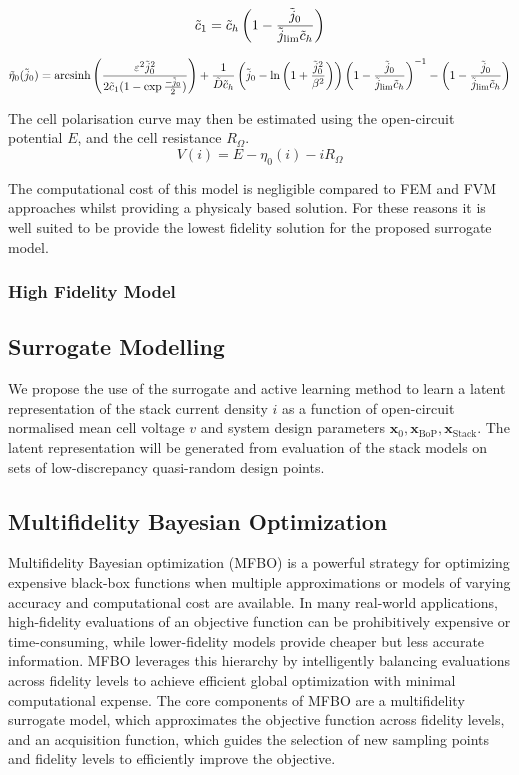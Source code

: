 \begin{equation}
	\tilde{c}_1 = \tilde{c}_h \left(1 - \frac{\tilde{j}_0}{\tilde{j}_{\text{lim}}\tilde{c}_h}\right)\label{eq:oxyconc}
\end{equation}

\begin{equation}
	\tilde{\eta}_0(\tilde{j}_0) = \text{arcsinh}\left(\frac{\varepsilon^2 \tilde{j}_0^2}{2 \tilde{c}_1 (1 - \exp{\frac{-\tilde{j}_0}{2}})}\right)
	+ \frac{1}{\tilde{D}\tilde{c}_h}\left(\tilde{j}_0 - \ln\left(1 + \frac{\tilde{j}_0^2}{\beta^2}\right)\right)\left(1 - \frac{\tilde{j}_0}{\tilde{j}_{\text{lim}}\tilde{c}_h}\right)^{-1}
	-\left(1 - \frac{\tilde{j}_0}{\tilde{j}_{\text{lim}}\tilde{c}_h}\right)
	\label{eq:kulfull}
\end{equation}

The cell polarisation curve may then be estimated using the open-circuit potential $E$, and the cell resistance \(R_{\Omega}\).
\begin{equation}
	V(i) = E - \eta_0(i) - iR_\Omega
\end{equation}

The computational cost of this model is negligible compared to FEM and FVM approaches whilst providing a physicaly based solution. For these reasons it is well suited to be provide the lowest fidelity solution for the proposed surrogate model.

\subsubsection{High Fidelity Model}

\subsection{Surrogate Modelling}
We propose the use of the surrogate and active learning method to learn a latent representation of the stack current density $i$ as a function of open-circuit normalised mean cell voltage $v$ and system design parameters $\bm{x}_0, \bm{x}_{\text{BoP}}, \bm{x}_{\text{Stack}}$.
The latent representation will be generated from evaluation of the stack models on sets of low-discrepancy quasi-random design points.

\subsection{Multifidelity Bayesian Optimization}

Multifidelity Bayesian optimization (MFBO) is a powerful strategy for optimizing expensive black-box functions when multiple approximations or models of varying accuracy and computational cost are available. In many real-world applications, high-fidelity evaluations of an objective function can be prohibitively expensive or time-consuming, while lower-fidelity models provide cheaper but less accurate information. MFBO leverages this hierarchy by intelligently balancing evaluations across fidelity levels to achieve efficient global optimization with minimal computational expense. The core components of MFBO are a multifidelity surrogate model, which approximates the objective function across fidelity levels, and an acquisition function, which guides the selection of new sampling points and fidelity levels to efficiently improve the objective.

